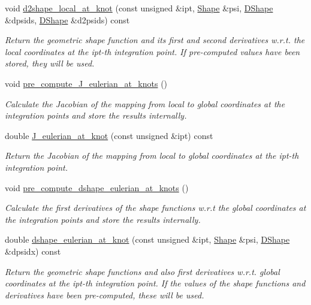 \begin{DoxyCompactItemize}
void \hyperlink{classoomph_1_1StorableShapeElementBase_af1b0ce3644efb101953a6dc2ce120a3e}{d2shape\+\_\+local\+\_\+at\+\_\+knot} (const unsigned \&ipt, \hyperlink{classoomph_1_1Shape}{Shape} \&psi, \hyperlink{classoomph_1_1DShape}{D\+Shape} \&dpsids, \hyperlink{classoomph_1_1DShape}{D\+Shape} \&d2psids) const
\begin{DoxyCompactList}\small\item\em Return the geometric shape function and its first and second derivatives w.\+r.\+t. the local coordinates at the ipt-\/th integration point. If pre-\/computed values have been stored, they will be used. \end{DoxyCompactList}\item 
void \hyperlink{classoomph_1_1StorableShapeElementBase_aa807b2f4c54bd0f48ed3b76070ad21b9}{pre\+\_\+compute\+\_\+\+J\+\_\+eulerian\+\_\+at\+\_\+knots} ()
\begin{DoxyCompactList}\small\item\em Calculate the Jacobian of the mapping from local to global coordinates at the integration points and store the results internally. \end{DoxyCompactList}\item 
double \hyperlink{classoomph_1_1StorableShapeElementBase_ad8fbccc3ef6b82a0f50fc1226fec777f}{J\+\_\+eulerian\+\_\+at\+\_\+knot} (const unsigned \&ipt) const
\begin{DoxyCompactList}\small\item\em Return the Jacobian of the mapping from local to global coordinates at the ipt-\/th integration point. \end{DoxyCompactList}\item 
void \hyperlink{classoomph_1_1StorableShapeElementBase_a9e936c1ce294614fab6db0ab864d9949}{pre\+\_\+compute\+\_\+dshape\+\_\+eulerian\+\_\+at\+\_\+knots} ()
\begin{DoxyCompactList}\small\item\em Calculate the first derivatives of the shape functions w.\+r.\+t the global coordinates at the integration points and store the results internally. \end{DoxyCompactList}\item 
double \hyperlink{classoomph_1_1StorableShapeElementBase_a6dba8c995caf1ce8075c8cd7d4220aaa}{dshape\+\_\+eulerian\+\_\+at\+\_\+knot} (const unsigned \&ipt, \hyperlink{classoomph_1_1Shape}{Shape} \&psi, \hyperlink{classoomph_1_1DShape}{D\+Shape} \&dpsidx) const
\begin{DoxyCompactList}\small\item\em Return the geometric shape functions and also first derivatives w.\+r.\+t. global coordinates at the ipt-\/th integration point. If the values of the shape functions and derivatives have been pre-\/computed, these will be used. \end{DoxyCompactList}\item 

\end{DoxyCompactItemize}
